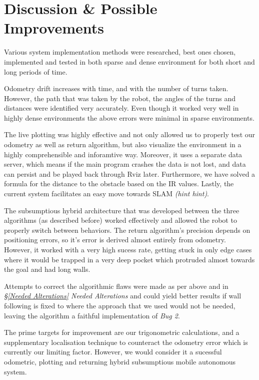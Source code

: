 \documentclass[11pt, a4paper]{article}
\begin{document}

\newpage
\section{Discussion \& Possible Improvements}

\label{Discussion}

Various system implementation methods were researched, best ones chosen, implemented and 
tested in both sparse and dense environment for both short and long periods of time.

Odometry drift increases with time, and with the number of turns taken. However, the path that was taken
by the robot, the angles of the turns and distances were identified very accurately. Even though it worked
very well in highly dense environments the above errors were minimal in sparse environments.

The live plotting was highly effective and not only allowed us to properly test our odometry as well as 
return algorithm, but also visualize the environment in a highly comprehensible and inforamtive way. 
Moreover, it uses a separate data server, which means if the main program crashes the data is not lost,
and data can persist and be played back through Rviz later. Furthermore, we have solved a 
formula for the distance to the obstacle based on the IR values. Lastly, the current system facilitates an 
easy move towards SLAM \textit{(hint hint)}.

The subsumptious hybrid architecture that was developed between the three algorithms (as described
before) worked effectively and allowed the robot to properly switch between behaviors. The return 
algorithm's precision depends on positioning errors, so it's error is derived almost entirely from 
odometry. However, it worked with a very high sucess rate, getting stuck in only edge cases where it would 
be trapped in a very deep pocket which protruded almost towards the goal and had long walls.

Attempts to correct the algorithmic flaws were made as per above and in \textit{\S\ref{Needed Alterations}
Needed Alterations} and could yield better results if wall following is fixed to where the approach that we used would not be needed, leaving the algorithm a faithful implementation of \textit{Bug 2}.

The prime targets for improvement are our trigonometric calculations, and a supplementary localisation
technique to counteract the odometry error which is currently our limiting factor.
However, we would consider it a sucessful odometric, plotting and returning hybrid subsumptious 
mobile autonomous system\texttrademark.
\end{document}
